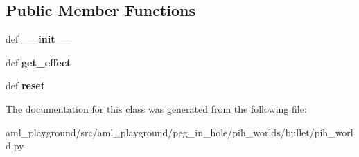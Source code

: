 \subsection*{Public Member Functions}
\begin{DoxyCompactItemize}
\item 
\hypertarget{classaml__playground_1_1peg__in__hole_1_1pih__worlds_1_1bullet_1_1pih__world_1_1_box_object_a760a10996d2011574da7d9528a324a16}{def {\bfseries \-\_\-\-\_\-init\-\_\-\-\_\-}}\label{classaml__playground_1_1peg__in__hole_1_1pih__worlds_1_1bullet_1_1pih__world_1_1_box_object_a760a10996d2011574da7d9528a324a16}

\item 
\hypertarget{classaml__playground_1_1peg__in__hole_1_1pih__worlds_1_1bullet_1_1pih__world_1_1_box_object_a996f669f242c73e939d81224f89f80b4}{def {\bfseries get\-\_\-effect}}\label{classaml__playground_1_1peg__in__hole_1_1pih__worlds_1_1bullet_1_1pih__world_1_1_box_object_a996f669f242c73e939d81224f89f80b4}

\item 
\hypertarget{classaml__playground_1_1peg__in__hole_1_1pih__worlds_1_1bullet_1_1pih__world_1_1_box_object_ab425448e2092e80840709e2896a73e93}{def {\bfseries reset}}\label{classaml__playground_1_1peg__in__hole_1_1pih__worlds_1_1bullet_1_1pih__world_1_1_box_object_ab425448e2092e80840709e2896a73e93}

\end{DoxyCompactItemize}


The documentation for this class was generated from the following file\-:\begin{DoxyCompactItemize}
\item 
aml\-\_\-playground/src/aml\-\_\-playground/peg\-\_\-in\-\_\-hole/pih\-\_\-worlds/bullet/pih\-\_\-world.\-py\end{DoxyCompactItemize}
